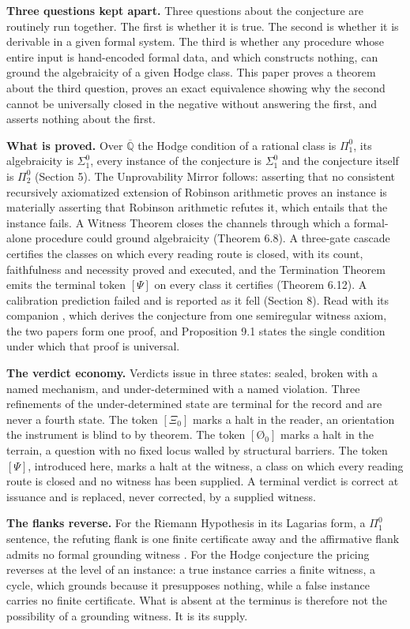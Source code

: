 \documentclass[10pt,twocolumn]{article}
\begin{document}
\textbf{Three questions kept apart.} Three questions about the
conjecture are routinely run together. The first is whether it is true.
The second is whether it is derivable in a given formal system. The
third is whether any procedure whose entire input is hand-encoded formal
data, and which constructs nothing, can ground the algebraicity of a
given Hodge class. This paper proves a theorem about the third question,
proves an exact equivalence showing why the second cannot be universally
closed in the negative without answering the first, and asserts nothing
about the first.

\textbf{What is proved.} Over \(\overline{\mathbb{Q}}\) the Hodge
condition of a rational class is \(\Pi^0_1\), its algebraicity is
\(\Sigma^0_1\), every instance of the conjecture is \(\Sigma^0_1\) and
the conjecture itself is \(\Pi^0_2\) (Section 5). The Unprovability
Mirror follows: asserting that no consistent recursively axiomatized
extension of Robinson arithmetic proves an instance is materially
asserting that Robinson arithmetic refutes it, which entails that the
instance fails. A Witness Theorem closes the channels through which a
formal-alone procedure could ground algebraicity (Theorem 6.8). A
three-gate cascade certifies the classes on which every reading route is
closed, with its count, faithfulness and necessity proved and executed,
and the Termination Theorem emits the terminal token \([\Psi]\) on every
class it certifies (Theorem 6.12). A calibration prediction failed and
is reported as it fell (Section 8). Read with its companion
\cite{islam2026w}, which derives the conjecture from one semiregular
witness axiom, the two papers form one proof, and Proposition 9.1 states
the single condition under which that proof is universal.

\textbf{The verdict economy.} Verdicts issue in three states: sealed,
broken with a named mechanism, and under-determined with a named
violation. Three refinements of the under-determined state are terminal
for the record and are never a fourth state. The token \([\Xi_0]\) marks
a halt in the reader, an orientation the instrument is blind to by
theorem. The token \([\text{\O}_0]\) marks a halt in the terrain, a
question with no fixed locus walled by structural barriers. The token
\([\Psi]\), introduced here, marks a halt at the witness, a class on
which every reading route is closed and no witness has been supplied. A
terminal verdict is correct at issuance and is replaced, never
corrected, by a supplied witness.

\textbf{The flanks reverse.} For the Riemann Hypothesis in its Lagarias
form, a \(\Pi^0_1\) sentence, the refuting flank is one finite
certificate away and the affirmative flank admits no formal grounding
witness \cite{islam2026rh}. For the Hodge conjecture the pricing
reverses at the level of an instance: a true instance carries a finite
witness, a cycle, which grounds because it presupposes nothing, while a
false instance carries no finite certificate. What is absent at the
terminus is therefore not the possibility of a grounding witness. It is
its supply.
\end{document}
